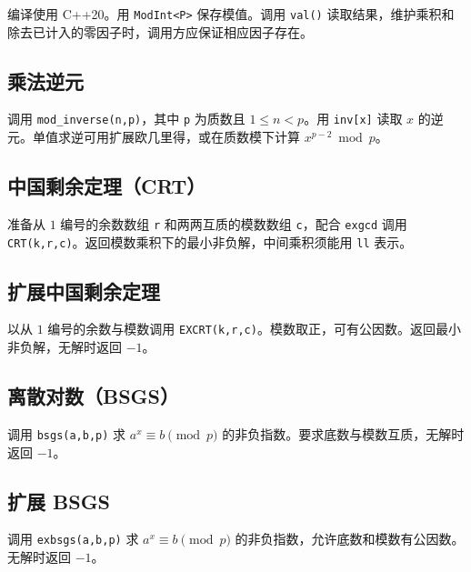 编译使用 C++20。用 \texttt{ModInt<P>} 保存模值。调用 \texttt{val()} 读取结果，维护乘积和除去已计入的零因子时，调用方应保证相应因子存在。


\subsection{乘法逆元}

调用 \texttt{mod\_inverse(n,p)}，其中 \texttt{p} 为质数且 $1\le n<p$。用 \texttt{inv[x]} 读取 $x$ 的逆元。单值求逆可用扩展欧几里得，或在质数模下计算 $x^{p-2}\bmod p$。


\subsection{中国剩余定理（CRT）}

准备从 $1$ 编号的余数数组 \texttt{r} 和两两互质的模数数组 \texttt{c}，配合 \texttt{exgcd} 调用 \texttt{CRT(k,r,c)}。返回模数乘积下的最小非负解，中间乘积须能用 \texttt{ll} 表示。


\subsection{扩展中国剩余定理}

以从 $1$ 编号的余数与模数调用 \texttt{EXCRT(k,r,c)}。模数取正，可有公因数。返回最小非负解，无解时返回 $-1$。


\subsection{离散对数（BSGS）}

调用 \texttt{bsgs(a,b,p)} 求 $a^x\equiv b\pmod p$ 的非负指数。要求底数与模数互质，无解时返回 $-1$。


\subsection{扩展 BSGS}

调用 \texttt{exbsgs(a,b,p)} 求 $a^x\equiv b\pmod p$ 的非负指数，允许底数和模数有公因数。无解时返回 $-1$。


